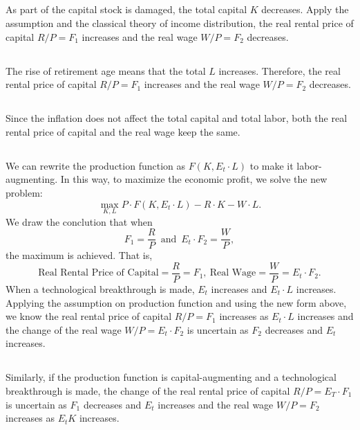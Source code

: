 \documentclass{article}
\begin{document}
\subsection{}
As part of the capital stock is damaged, the total capital $K$ decreases. Apply the assumption and the classical theory of income distribution, the real rental price of capital $R/P = F_1$ increases and the real wage $W/P = F_2$ decreases.

\subsection{}
The rise of retirement age means that the total $L$ increases. Therefore, the real rental price of capital $R/P = F_1$ increases and the real wage $W/P = F_2$ decreases.

\subsection{}
Since the inflation does not affect the total capital and total labor, both the real rental price of capital and the real wage keep the same.

\subsection{}
We can rewrite the production function as $F(K, E_t \cdot L)$ to make it labor-augmenting. In this way, to maximize the economic profit, we solve the new problem:
\[
    \max_{K, L}{P \cdot F(K, E_t \cdot L) - R \cdot K - W \cdot L}.
\]
We draw the conclution that when
\[
    F_1 = \frac{R}{P}\,
    \text{ and }\,
    E_t \cdot F_2 = \frac{W}{P},
\]
the maximum is achieved. That is,
\[
    \text{Real Rental Price of Capital}
    = \frac{R}{P} = F_1,\ 
    \text{Real Wage}
    = \frac{W}{P} = E_t \cdot F_2.
\]
When a technological breakthrough is made, $E_t$ increases and $E_t \cdot L$ increases. Applying the assumption on production function and using the new form above, we know the real rental price of capital $R/P = F_1$ increases as $E_t \cdot L$ increases and the change of the real wage $W/P = E_t \cdot F_2$ is uncertain as $F_2$ decreases and $E_t$ increases.

\subsection{}
Similarly, if the production function is capital-augmenting and a technological breakthrough is made, the change of the real rental price of capital $R/P = E_T \cdot F_1$ is uncertain as $F_1$ decreases and $E_t$ increases and the real wage $W/P = F_2$ increases as $E_t K$ increases. 
\end{document}
